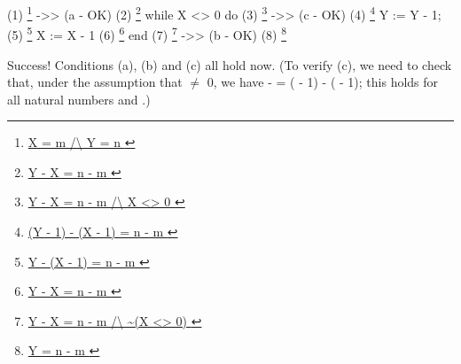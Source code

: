 \documentclass[12pt]{report}
\begin{document}
    (1)    \footnote{\url{ X = m /\ Y = n }} ->>                            (a - OK)
    (2)    \footnote{\url{ Y - X = n - m }}
             while X <> 0 do
    (3)                    \footnote{\url{ Y - X = n - m /\ X <> 0 }} ->>   (c - OK)
    (4)                    \footnote{\url{ (Y - 1) - (X - 1) = n - m }}
               Y := Y - 1;
    (5)                    \footnote{\url{ Y - (X - 1) = n - m }}
               X := X - 1
    (6)                    \footnote{\url{ Y - X = n - m }}
             end
    (7)    \footnote{\url{ Y - X = n - m /\ ~(X <> 0) }} ->>                (b - OK)
    (8)    \footnote{\url{ Y = n - m }}


    Success!  Conditions (a), (b) and (c) all hold now.  (To
    verify (c), we need to check that, under the assumption that
     \ensuremath{\not=} 0, we have  -  = ( - 1) - ( - 1); this holds for all
    natural numbers  and .)
\end{document}
